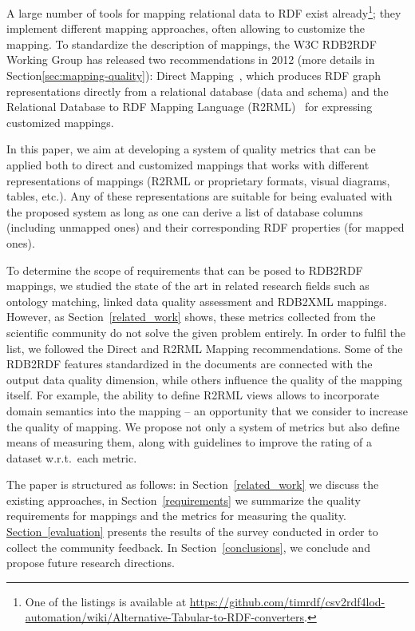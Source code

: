 A large number of tools for mapping relational data to RDF exist already\footnote{One of the listings is available at \url{https://github.com/timrdf/csv2rdf4lod-automation/wiki/Alternative-Tabular-to-RDF-converters}.}; they implement different mapping approaches, often allowing to customize the mapping.
To standardize the description of mappings, the W3C RDB2RDF Working Group has released two recommendations in 2012 (more details in~ Section\ref{sec:mapping-quality}): Direct Mapping~\cite{direct_mapping}, which produces RDF graph representations directly from a relational database (data and schema) and the Relational Database to RDF Mapping Language (R2RML)~\cite{r2rml} for expressing customized mappings.
 
In this paper, we aim at developing a system of quality metrics that can be applied both to direct and customized mappings that works with different representations of mappings (R2RML or proprietary formats, visual diagrams, tables, etc.).
Any of these representations are suitable for being evaluated with the proposed system as long as one can derive a list of database columns (including unmapped ones) and their corresponding RDF properties (for mapped ones).

To determine the scope of requirements that can be posed to RDB2RDF mappings, we studied the state of the art in related research fields such as ontology matching, linked data quality assessment and RDB2XML mappings. 
However, as Section~\ref{related_work} shows, these metrics collected from the scientific community do not solve the given problem entirely.
In order to fulfil the list, we followed the Direct and R2RML Mapping recommendations.
Some of the RDB2RDF features standardized in the documents are connected with the output data quality dimension, while others influence the quality of the mapping itself. 
For example, the ability to define R2RML views allows to incorporate domain semantics into the mapping – an opportunity that we consider to increase the quality of mapping.
We propose not only a system of metrics but also define means of measuring them, along with guidelines to improve the rating of a dataset w.r.t.\ each metric.

The paper is structured as follows: in Section~\ref{related_work} we discuss the existing approaches, in Section~\ref{requirements} we summarize the quality requirements for mappings and the metrics for measuring the quality.
\hyperref[evaluation]{Section~\ref*{evaluation}} presents the results of the survey conducted in order to collect the community feedback.
In Section~\ref{conclusions}, we conclude and propose future research directions.

